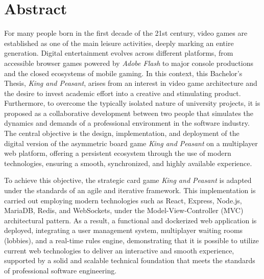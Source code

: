 \chapter*{Abstract}
For many people born in the first decade of the 21st century, video games are established as one of the main leisure activities, deeply marking an entire generation. Digital entertainment evolves across different platforms, from accessible browser games powered by \textit{Adobe Flash} to major console productions and the closed ecosystems of mobile gaming. In this context, this Bachelor's Thesis, \textit{King and Peasant}, arises from an interest in video game architecture and the desire to invest academic effort into a creative and stimulating product. Furthermore, to overcome the typically isolated nature of university projects, it is proposed as a collaborative development between two people that simulates the dynamics and demands of a professional environment in the software industry. The central objective is the design, implementation, and deployment of the digital version of the asymmetric board game \textit{King and Peasant} on a multiplayer web platform, offering a persistent ecosystem through the use of modern technologies, ensuring a smooth, synchronized, and highly available experience.

To achieve this objective, the strategic card game \textit{King and Peasant} is adapted under the standards of an agile and iterative framework. This implementation is carried out employing modern technologies such as React, Express, Node.js, MariaDB, Redis, and WebSockets, under the Model-View-Controller (MVC) architectural pattern. As a result, a functional and dockerized web application is deployed, integrating a user management system, multiplayer waiting rooms (lobbies), and a real-time rules engine, demonstrating that it is possible to utilize current web technologies to deliver an interactive and smooth experience, supported by a solid and scalable technical foundation that meets the standards of professional software engineering.